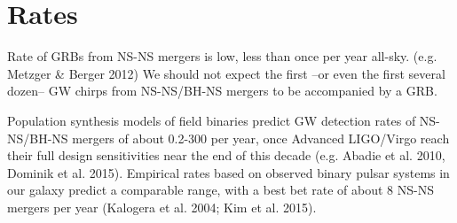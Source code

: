 \section{Rates}

Rate of GRBs from NS-NS mergers is low, less than once per year all-sky. (e.g. Metzger \& Berger 2012)
We should not expect the first --or even the first several dozen-- GW chirps from NS-NS/BH-NS mergers to be accompanied by a GRB.


Population synthesis models of field binaries predict GW detection rates of NS-NS/BH-NS mergers of about 0.2-300 per year, once Advanced LIGO/Virgo reach their full design sensitivities near the end of this decade (e.g. Abadie et al. 2010, Dominik et al. 2015).
Empirical rates based on observed binary pulsar systems in our galaxy predict a comparable range, with a best bet rate of about 8 NS-NS mergers per year (Kalogera et al. 2004; Kim et al. 2015).









